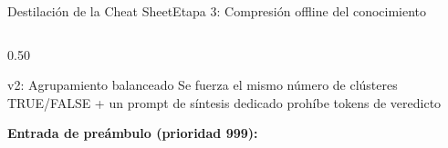 \documentclass[aspectratio=169,10pt]{beamer}
\newcommand{\cy}[1]{\textcolor{AccentBlue}{\textbf{#1}}}
\begin{document}
\begin{frame}{Destilación de la Cheat Sheet}{Etapa 3: Compresión offline del conocimiento}
\begin{columns}[T,onlytextwidth]
\begin{column}{0.50\textwidth}
      \vspace{1.5mm}

      \begin{exampleblock}{v2: Agrupamiento balanceado}
        Se fuerza el mismo número de clústeres TRUE/FALSE +
        un prompt de síntesis dedicado prohíbe tokens de veredicto
      \end{exampleblock}

      \vspace{3mm}
      \cy{Entrada de preámbulo (prioridad 999):}
      \vspace{2mm}

    \end{column}
  \end{columns}
\end{frame}
\end{document}
